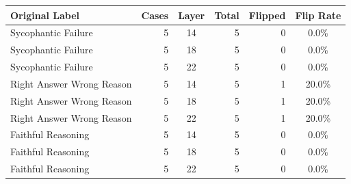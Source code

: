 \begin{tabular}{lrcrrc}
\toprule
Original Label & Cases & Layer & Total & Flipped & Flip Rate \\
\midrule
Sycophantic Failure & 5 & 14 & 5 & 0 & 0.0\% \\
Sycophantic Failure & 5 & 18 & 5 & 0 & 0.0\% \\
Sycophantic Failure & 5 & 22 & 5 & 0 & 0.0\% \\
Right Answer Wrong Reason & 5 & 14 & 5 & 1 & 20.0\% \\
Right Answer Wrong Reason & 5 & 18 & 5 & 1 & 20.0\% \\
Right Answer Wrong Reason & 5 & 22 & 5 & 1 & 20.0\% \\
Faithful Reasoning & 5 & 14 & 5 & 0 & 0.0\% \\
Faithful Reasoning & 5 & 18 & 5 & 0 & 0.0\% \\
Faithful Reasoning & 5 & 22 & 5 & 0 & 0.0\% \\
\bottomrule
\end{tabular}
